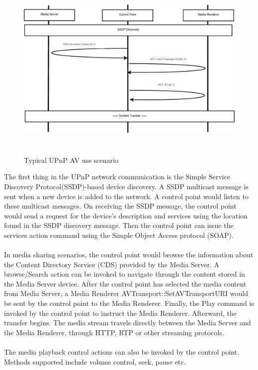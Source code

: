 \begin{figure}[htb] 
\centering \includegraphics[height=9cm]{charts/chart1} 
\caption{Typical UPnP AV use scenario \label{av_use_scenario}} 
\end{figure} 

The first thing in the UPnP network communication is the Simple Service Discovery 
Protocol(SSDP)-based device discovery. A SSDP multicast message is sent when a 
new device is added to the network. A control point would listen to these 
multicast messages. On receiving the SSDP message, the control point would send a request for the device's description and services using the location found in the SSDP discovery message. Then the control point can issue the services action command using the Simple Object Access protocol (SOAP).\\
\\ 
In media sharing scenarios, the control point would browse the information about 
the Content Directory Service (CDS) provided by the Media Server. A 
browse/Search action can be invoked to navigate through the content stored in 
the Media Server device. After the control point has selected the media content from 
Media Server, a Media Renderer AVTransport::SetAVTransportURI would be sent by 
the control point to the Media Renderer. Finally, the Play command is invoked by 
the control point to instruct the Media Renderer. Afterward, the transfer begins. The media 
stream travels directly between the Media Server and the Media Renderer, through HTTP, 
RTP or other streaming protocols. \\
\\
The media playback control actions can also be invoked by the control point. Methods 
supported include volume control, seek, pause etc. 

